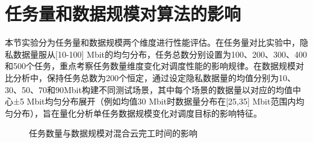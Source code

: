 \section{任务量和数据规模对算法的影响}

本节实验分为任务量和数据规模两个维度进行性能评估。在任务量对比实验中，隐私数据量服从[10-100] Mbit的均匀分布，任务总数分别设置为100、200、300、400和500个任务，重点考察任务数量维度变化对调度性能的影响规律。在数据规模对比分析中，保持任务总数为200个恒定，通过设定隐私数据量的均值分别为10、30、50、70和90Mbit构建不同测试场景，其中每个场景的数据量以对应的均值中心±5 Mbit均匀分布展开（例如均值30 Mbit时数据量分布在[25,35] Mbit范围内均匀分布），旨在量化分析单任务数据规模变化对调度目标的影响特征。

\begin{figure}[htb]%
    \caption{任务数量与数据规模对混合云完工时间的影响}\label{fig:task_amount_vs_makespan}
\end{figure}

